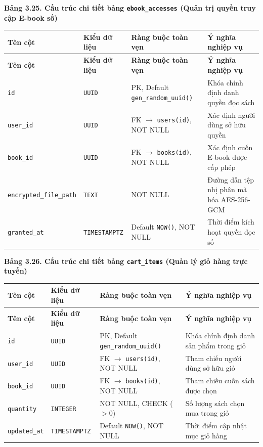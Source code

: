 \documentclass[11pt, a4paper]{report}
\begin{document}
\vspace{0.3cm}
\noindent\textbf{Bảng 3.25. Cấu trúc chi tiết bảng \texttt{ebook\_accesses} (Quản trị quyền truy cập E-book số)}

\begin{longtable}{p{3.2cm} p{2.6cm} p{4.0cm} p{4.5cm}}
\toprule
\textbf{Tên cột} & \textbf{Kiểu dữ liệu} & \textbf{Ràng buộc toàn vẹn} & \textbf{Ý nghĩa nghiệp vụ} \\
\midrule
\endfirsthead
\toprule
\textbf{Tên cột} & \textbf{Kiểu dữ liệu} & \textbf{Ràng buộc toàn vẹn} & \textbf{Ý nghĩa nghiệp vụ} \\
\midrule
\endhead
\bottomrule
\endfoot
\texttt{id} & \texttt{UUID} & PK, Default \texttt{gen\_random\_uuid()} & Khóa chính định danh quyền đọc sách \\
\midrule
\texttt{user\_id} & \texttt{UUID} & FK $\rightarrow$ \texttt{users(id)}, NOT NULL & Xác định người dùng sở hữu quyền \\
\midrule
\texttt{book\_id} & \texttt{UUID} & FK $\rightarrow$ \texttt{books(id)}, NOT NULL & Xác định cuốn E-book được cấp phép \\
\midrule
\texttt{encrypted\_file\_path}& \texttt{TEXT} & NOT NULL & Đường dẫn tệp nhị phân mã hóa AES-256-GCM \\
\midrule
\texttt{granted\_at} & \texttt{TIMESTAMPTZ} & Default \texttt{NOW()}, NOT NULL & Thời điểm kích hoạt quyền đọc số \\
\bottomrule
\end{longtable}

\vspace{0.3cm}
\noindent\textbf{Bảng 3.26. Cấu trúc chi tiết bảng \texttt{cart\_items} (Quản lý giỏ hàng trực tuyến)}
\nopagebreak

\begin{longtable}{p{3.2cm} p{2.6cm} p{4.0cm} p{4.5cm}}
\toprule
\textbf{Tên cột} & \textbf{Kiểu dữ liệu} & \textbf{Ràng buộc toàn vẹn} & \textbf{Ý nghĩa nghiệp vụ} \\
\midrule
\endfirsthead
\toprule
\textbf{Tên cột} & \textbf{Kiểu dữ liệu} & \textbf{Ràng buộc toàn vẹn} & \textbf{Ý nghĩa nghiệp vụ} \\
\midrule
\endhead
\bottomrule
\endfoot
\texttt{id} & \texttt{UUID} & PK, Default \texttt{gen\_random\_uuid()} & Khóa chính định danh sản phẩm trong giỏ \\
\midrule
\texttt{user\_id} & \texttt{UUID} & FK $\rightarrow$ \texttt{users(id)}, NOT NULL & Tham chiếu người dùng sở hữu giỏ \\
\midrule
\texttt{book\_id} & \texttt{UUID} & FK $\rightarrow$ \texttt{books(id)}, NOT NULL & Tham chiếu cuốn sách được chọn \\
\midrule
\texttt{quantity} & \texttt{INTEGER} & NOT NULL, CHECK ($> 0$) & Số lượng sách chọn mua trong giỏ \\
\midrule
\texttt{updated\_at} & \texttt{TIMESTAMPTZ} & Default \texttt{NOW()}, NOT NULL & Thời điểm cập nhật mục giỏ hàng \\
\bottomrule
\end{longtable}
\end{document}
